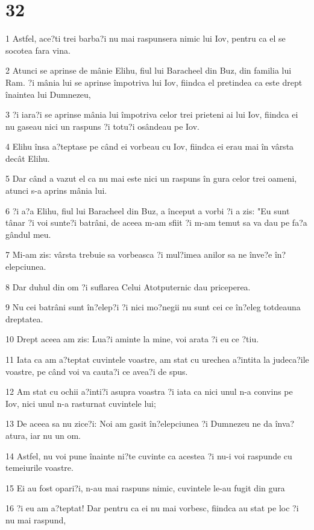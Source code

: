 \chapter{32}

\par 1 Astfel, ace?ti trei barba?i nu mai raspunsera nimic lui Iov, pentru ca el se socotea fara vina.
\par 2 Atunci se aprinse de mânie Elihu, fiul lui Baracheel din Buz, din familia lui Ram. ?i mânia lui se aprinse împotriva lui Iov, fiindca el pretindea ca este drept înaintea lui Dumnezeu,
\par 3 ?i iara?i se aprinse mânia lui împotriva celor trei prieteni ai lui Iov, fiindca ei nu gaseau nici un raspuns ?i totu?i osândeau pe Iov.
\par 4 Elihu însa a?teptase pe când ei vorbeau cu Iov, fiindca ei erau mai în vârsta decât Elihu.
\par 5 Dar când a vazut el ca nu mai este nici un raspuns în gura celor trei oameni, atunci s-a aprins mânia lui.
\par 6 ?i a?a Elihu, fiul lui Baracheel din Buz, a început a vorbi ?i a zis: "Eu sunt tânar ?i voi sunte?i batrâni, de aceea m-am sfiit ?i m-am temut sa va dau pe fa?a gândul meu.
\par 7 Mi-am zis: vârsta trebuie sa vorbeasca ?i mul?imea anilor sa ne înve?e în?elepciunea.
\par 8 Dar duhul din om ?i suflarea Celui Atotputernic dau priceperea.
\par 9 Nu cei batrâni sunt în?elep?i ?i nici mo?negii nu sunt cei ce în?eleg totdeauna dreptatea.
\par 10 Drept aceea am zis: Lua?i aminte la mine, voi arata ?i eu ce ?tiu.
\par 11 Iata ca am a?teptat cuvintele voastre, am stat cu urechea a?intita la judeca?ile voastre, pe când voi va cauta?i ce avea?i de spus.
\par 12 Am stat cu ochii a?inti?i asupra voastra ?i iata ca nici unul n-a convins pe Iov, nici unul n-a rasturnat cuvintele lui;
\par 13 De aceea sa nu zice?i: Noi am gasit în?elepciunea ?i Dumnezeu ne da înva?atura, iar nu un om.
\par 14 Astfel, nu voi pune înainte ni?te cuvinte ca acestea ?i nu-i voi raspunde cu temeiurile voastre.
\par 15 Ei au fost opari?i, n-au mai raspuns nimic, cuvintele le-au fugit din gura
\par 16 ?i eu am a?teptat! Dar pentru ca ei nu mai vorbesc, fiindca au stat pe loc ?i nu mai raspund,

